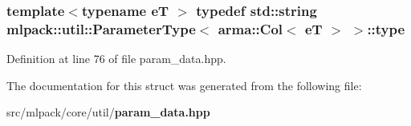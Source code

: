 \subsubsection[{type}]{\setlength{\rightskip}{0pt plus 5cm}template$<$typename eT $>$ typedef {\bf std\+::string} {\bf mlpack\+::util\+::\+Parameter\+Type}$<$ arma\+::\+Col$<$ eT $>$ $>$\+::{\bf type}}\label{structmlpack_1_1util_1_1ParameterType_3_01arma_1_1Col_3_01eT_01_4_01_4_af1a44433c70c193cea78ce2281fb137a}


Definition at line 76 of file param\+\_\+data.\+hpp.



The documentation for this struct was generated from the following file\+:\begin{DoxyCompactItemize}
\item 
src/mlpack/core/util/{\bf param\+\_\+data.\+hpp}\end{DoxyCompactItemize}
